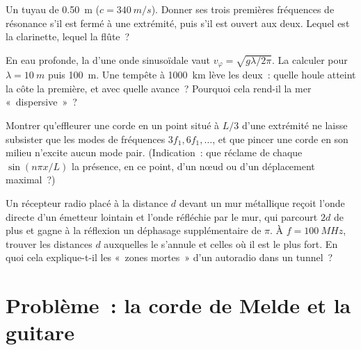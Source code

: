 \begin{exercise}[$\star\star$]\label{exo:b1:wave-propagation:9}
Un tuyau de \qty{0.50}{m} ($c = \qty{340}{m/s}$). Donner ses trois
premières fréquences de résonance s'il est fermé à une extrémité, puis
s'il est ouvert aux deux. Lequel est la clarinette, lequel la flûte~?
\end{exercise}

\begin{exercise}[$\star\star\star$]\label{exo:b1:wave-propagation:10}
En eau profonde, la  d'une onde sinusoïdale vaut
$v_\varphi = \sqrt{g\lambda/2\pi}$. La calculer pour $\lambda = \qty{10}{m}$
puis \qty{100}{m}. Une tempête à \qty{1000}{km} lève les deux~: quelle
houle atteint la côte la première, et avec quelle avance~? Pourquoi cela
rend-il la mer «~dispersive~»~?
\end{exercise}

\begin{exercise}[$\star\star\star$]\label{exo:b1:wave-propagation:11}
Montrer qu'effleurer une corde en un point situé à $L/3$ d'une extrémité
ne laisse subsister que les modes de fréquences $3f_1, 6f_1, \dots$, et
que pincer une corde en son milieu n'excite aucun mode pair. (Indication~:
que réclame de chaque $\sin(n\pi x/L)$ la présence, en ce point, d'un
nœud ou d'un déplacement maximal~?)
\end{exercise}

\begin{exercise}[$\star\star\star$]\label{exo:b1:wave-propagation:12}
Un récepteur radio placé à la distance $d$ devant un mur métallique
reçoit l'onde directe d'un émetteur lointain et l'onde réfléchie par le
mur, qui parcourt $2d$ de plus et gagne à la réflexion un déphasage
supplémentaire de $\pi$. À $f = \qty{100}{MHz}$, trouver les distances
$d$ auxquelles le  s'annule et celles où il est le plus fort. En
quoi cela explique-t-il les «~zones mortes~» d'un autoradio dans un tunnel~?
\end{exercise}

\section{Problème~: la corde de Melde et la guitare}

